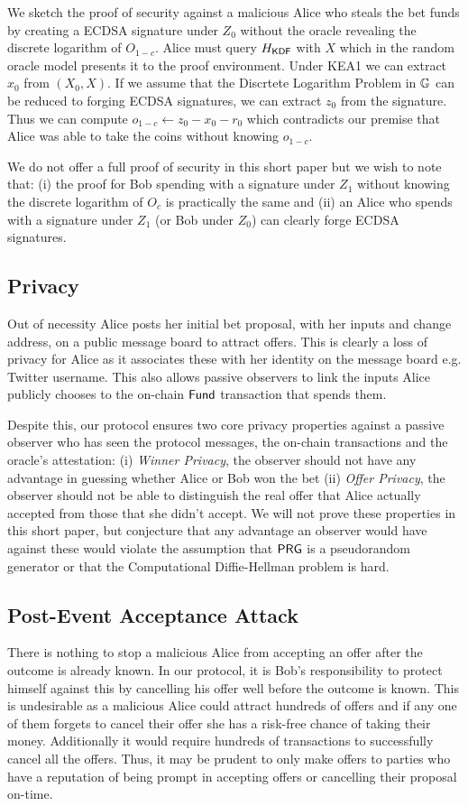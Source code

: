 \documentclass[runningheads]{llncs}
\begin{document}
We sketch the proof of security against a malicious Alice who steals the bet funds by creating a ECDSA signature under $Z_0$ without the oracle revealing the discrete logarithm of $O_{1-c}$. Alice must query $H_{\textsf{KDF}}$ with $X$ which in the random oracle model presents it to the proof environment. Under KEA1 we can extract $x_0$ from $(X_0,X)$. If we assume that the Discrtete Logarithm Problem in $\mathbb{G}$ can be reduced to forging ECDSA signatures, we can extract $z_0$ from the signature. Thus we can compute $o_{1-c} \gets z_0 - x_0 - r_0$ which contradicts our premise that Alice was able to take the coins without knowing $o_{1-c}$.

We do not offer a full proof of security in this short paper but we wish to note that: (i) the proof for Bob spending with a signature under $Z_1$ without knowing the discrete logarithm of $O_c$ is practically the same and (ii) an Alice who spends with a signature under $Z_1$ (or Bob under $Z_0$) can clearly forge ECDSA signatures.

\subsection{Privacy}

Out of necessity Alice posts her initial bet proposal, with her inputs and change address, on a public message board to attract offers. This is clearly a loss of privacy for Alice as it associates these with her identity on the message board e.g. Twitter username. This also allows passive observers to link the inputs Alice publicly chooses to the on-chain $\textsf{Fund}$ transaction that spends them.

Despite this, our protocol ensures two core privacy properties against a passive observer who has seen the protocol messages, the on-chain transactions and the oracle's attestation: (i) \emph{Winner Privacy}, the observer should not have any advantage in guessing whether Alice or Bob won the bet (ii) \emph{Offer Privacy}, the observer should not be able to distinguish the real offer that Alice actually accepted from those that she didn't accept. We will not prove these properties in this short paper, but conjecture that any advantage an observer would have against these would violate the assumption that $\textsf{PRG}$ is a pseudorandom generator or that the Computational Diffie-Hellman problem is hard.

\subsection{Post-Event Acceptance Attack}
\label{post-event-acceptance-attack}
There is nothing to stop a malicious Alice from accepting an offer after the outcome is already known. In our protocol, it is Bob's responsibility to protect himself against this by cancelling his offer well before the outcome is known. This is undesirable as a malicious Alice could attract hundreds of offers and if any one of them forgets to cancel their offer she has a risk-free chance of taking their money. Additionally it would require hundreds of transactions to successfully cancel all the offers. Thus, it may be prudent to only make offers to parties who have a reputation of being prompt in accepting offers or cancelling their proposal on-time.
\end{document}
